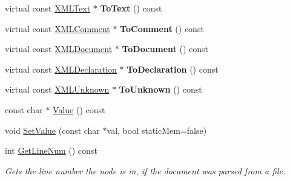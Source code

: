 \begin{DoxyCompactItemize}
\item 
\mbox{\label{classtinyxml2_1_1_x_m_l_node_acb9ccc1beda27c0efcb0545683c3e7f4}} 
virtual const \hyperlink{classtinyxml2_1_1_x_m_l_text}{X\+M\+L\+Text} $\ast$ {\bfseries To\+Text} () const
\item 
\mbox{\label{classtinyxml2_1_1_x_m_l_node_a6a53bb83faf5c0ccc95b6cf74dba0025}} 
virtual const \hyperlink{classtinyxml2_1_1_x_m_l_comment}{X\+M\+L\+Comment} $\ast$ {\bfseries To\+Comment} () const
\item 
\mbox{\label{classtinyxml2_1_1_x_m_l_node_ae8a5250331a5f12e10843fcb5ef3ef0b}} 
virtual const \hyperlink{classtinyxml2_1_1_x_m_l_document}{X\+M\+L\+Document} $\ast$ {\bfseries To\+Document} () const
\item 
\mbox{\label{classtinyxml2_1_1_x_m_l_node_ac48bb4bf9eb7bb3654ad4b94945db9a1}} 
virtual const \hyperlink{classtinyxml2_1_1_x_m_l_declaration}{X\+M\+L\+Declaration} $\ast$ {\bfseries To\+Declaration} () const
\item 
\mbox{\label{classtinyxml2_1_1_x_m_l_node_af29ffd6cbe609b6fa04a705256150408}} 
virtual const \hyperlink{classtinyxml2_1_1_x_m_l_unknown}{X\+M\+L\+Unknown} $\ast$ {\bfseries To\+Unknown} () const
\item 
const char $\ast$ \hyperlink{classtinyxml2_1_1_x_m_l_node_a0485e51c670e741884cfd8362274d680}{Value} () const
\item 
void \hyperlink{classtinyxml2_1_1_x_m_l_node_a09dd68cf9eae137579f6e50f36487513}{Set\+Value} (const char $\ast$val, bool static\+Mem=false)
\item 
\mbox{\label{classtinyxml2_1_1_x_m_l_node_a9b5fc636646fda761d342c72e91cb286}} 
int \hyperlink{classtinyxml2_1_1_x_m_l_node_a9b5fc636646fda761d342c72e91cb286}{Get\+Line\+Num} () const
\begin{DoxyCompactList}\small\item\em Gets the line number the node is in, if the document was parsed from a file. \end{DoxyCompactList}\item 
\mbox{\label{classtinyxml2_1_1_x_m_l_node_ae0f62bc186c56c2e0483ebd52dbfbe34}} 

\end{DoxyCompactItemize}
